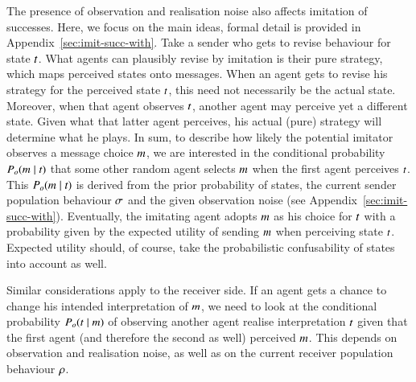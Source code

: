 \documentclass[12pt,english]{article}
\numberwithin{equation}{section}
\begin{document}
The presence of observation and realisation noise also affects imitation of successes. Here, we
focus on the main ideas, formal detail is provided in Appendix~\ref{sec:imit-succ-with}. Take a
sender who gets to revise behaviour for state $t$. What agents can plausibly revise by
imitation is their pure strategy, which maps perceived states onto messages. When an agent gets
to revise his strategy for the perceived state $t$, this need not necessarily be the
actual state. Moreover, when that agent observes $t$, another agent may perceive yet a
different state. Given what that latter agent perceives, his actual (pure) strategy will
determine what he plays. In sum, to describe how likely the potential imitator observes a
message choice $m$, we are interested in the conditional probability
$P_o(m \mid t)$ that some other random agent selects $m$ when the first
agent perceives $t$. This $P_o(m \mid t)$ is derived from the prior
probability of states, the current sender population behaviour $\sigma$ and the given
observation noise (see Appendix~\ref{sec:imit-succ-with}). Eventually, the imitating agent adopts
$m$ as his choice for $t$ with a probability given by the expected utility of sending
$m$ when perceiving state $t$. Expected utility should, of course, take the
probabilistic confusability of states into account as well.

Similar considerations apply to the receiver side. If an agent gets a chance to change his
intended interpretation of $m$, we need to look at the conditional probability
$P_o(t \mid m)$ of observing another agent realise interpretation $t$ given
that the first agent (and therefore the second as well) perceived $m$. This depends on
observation and realisation noise, as well as on the current receiver population behaviour
$\rho$.
\end{document}
